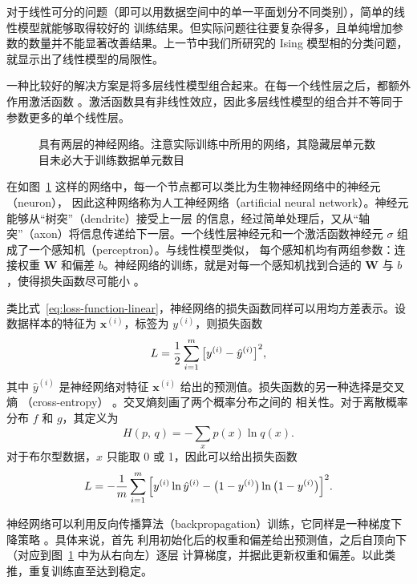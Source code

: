 对于线性可分的问题（即可以用数据空间中的单一平面划分不同类别），简单的线性模型就能够取得较好的
训练结果。但实际问题往往要复杂得多，且单纯增加参数的数量并不能显著改善结果。上一节中我们所研究的
Ising 模型相的分类问题，就显示出了线性模型的局限性。

一种比较好的解决方案是将多层线性模型组合起来。在每一个线性层之后，都额外作用激活函数
\cite{zhouzhihua}。激活函数具有非线性效应，因此多层线性模型的组合并不等同于参数更多的单个线性层。

\begin{figure}[htb]
  \centering
  \caption{具有两层的神经网络。注意实际训练中所用的网络，其隐藏层单元数目未必大于训练数据单元数目}
  \label{fig:neural-net}
\end{figure}

在如图~\ref{fig:neural-net} 这样的网络中，每一个节点都可以类比为生物神经网络中的神经元（neuron），
因此这种网络称为人工神经网络（artificial neural network）。神经元能够从“树突”（dendrite）接受上一层
的信息，经过简单处理后，又从“轴突”（axon）将信息传递给下一层。一个线性层神经元和一个激活函数神经元
$\sigma$ 组成了一个感知机（perceptron）\cite{zhouzhihua,nielsen2015neural}。与线性模型类似，
每个感知机均有两组参数：连接权重 $\bm{W}$ 和偏差 $b$。神经网络的训练，就是对每一个感知机找到合适的
$\bm{W}$ 与 $b$，使得损失函数尽可能小 \cite{zhouzhihua}。

类比式~\eqref{eq:loss-function-linear}，神经网络的损失函数同样可以用均方差表示。设数据样本的特征为
$\bm{x}^{(i)}$，标签为 $y^{(i)}$，则损失函数 \cite{zhouzhihua,nielsen2015neural}
\begin{equation}
  L = \frac{1}{2} \sum_{i=1}^m \qty\big[y^{(i)} - \hat{y}^{(i)}]^2,
\end{equation}
其中 $\hat{y}^{(i)}$ 是神经网络对特征 $\bm{x}^{(i)}$ 给出的预测值。损失函数的另一种选择是交叉熵
（cross-entropy） \cite{nielsen2015neural,goodfellow2016deep}。交叉熵刻画了两个概率分布之间的
相关性。对于离散概率分布 $f$ 和 $g$，其定义为
\begin{equation}
  H(p,\,q) = - \sum_x p(x) \ln q(x).
\end{equation}
对于布尔型数据，$x$ 只能取 0 或 1，因此可以给出损失函数 \cite{nielsen2015neural}
\begin{equation}
  L = - \frac{1}{m} \sum_{i=1}^m
        \qty\Big[y^{(i)}\ln\hat{y}^{(i)} - \qty\big(1-y^{(i)})\ln\qty\big(1-y^{(i)})]^2.
\end{equation}

神经网络可以利用反向传播算法（backpropagation）训练，它同样是一种梯度下降策略
\cite{zhouzhihua,nielsen2015neural,lecun2015deep}。具体来说，首先
利用初始化后的权重和偏差给出预测值，之后自顶向下（对应到图~\ref{fig:neural-net} 中为从右向左）逐层
计算梯度，并据此更新权重和偏差。以此类推，重复训练直至达到稳定。

